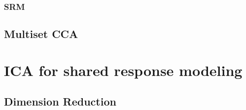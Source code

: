 \documentclass[12pt]{report}
\begin{document}
\subsection{SRM}
\section{Multiset CCA}

\chapter{ICA for shared response modeling}
\section{Dimension Reduction}
\end{document}
